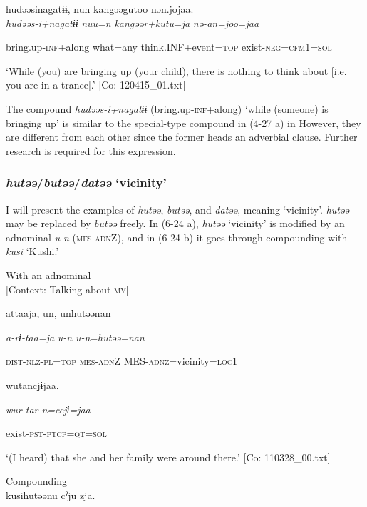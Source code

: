 \ea\label{ex:6-23}
{\TM}
\gll hudəəsinagatɨɨ,  nun  kangəəgutoo  nən.jojaa.\\

    \textit{hudəəs-i+nagatɨɨ}  \textit{nuu=n}  \textit{kangəər+kutu=ja}  \textit{nə-an=joo=jaa}

    bring.up-\textsc{inf}+along  what=any  think.INF+event=\textsc{top}  exist-\textsc{neg}=\textsc{cfm}1=\textsc{sol}

\glt    ‘While (you) are bringing up (your child), there is nothing to think about [i.e. you are in a trance].’ [Co: 120415\_01.txt]
\z

The compound \textit{hudəəs-i+nagatɨɨ} (bring.up-\textsc{inf}+along) ‘while (someone) is bringing up’ is similar to the special-type compound in (4-27 a) in  However, they are different from each other since the former heads an adverbial clause. Further research is required for this expression.

\subsubsection{\textit{hutəə}/\textit{butəə}/\textit{datəə} ‘vicinity’}

I will present the examples of \textit{hutəə}, \textit{butəə}, and \textit{datəə}, meaning ‘vicinity’. \textit{hutəə} may be replaced by \textit{butəə} freely. In (6-24 a), \textit{hutəə} ‘vicinity’ is modified by an adnominal \textit{u-n} (\textsc{mes}-\textsc{adn}Z), and in (6-24 b) it goes through compounding with \textit{kusi} ‘Kushi.’

\ea\label{ex:6-24}
\ea With an adnominal\\{}
[Context: Talking about \textsc{my}]

{\TM}
\gll attaaja,  un,  unhutəənan

      \textit{a-rɨ-taa=ja}  \textit{u-n}  \textit{u-n=hutəə=nan}

      \textsc{dist}-\textsc{nlz}-\textsc{pl}=\textsc{top}  \textsc{mes}-\textsc{adn}Z  MES-\textsc{adnz}=vicinity=\textsc{loc}1

      wutancjɨjaa.

      \textit{wur-tar-n=ccjɨ=jaa}

      exist-\textsc{pst}-\textsc{ptcp}=\textsc{qt}=\textsc{sol}

\glt ‘(I heard) that she and her family were around there.’ [Co: 110328\_00.txt]
\z

 \ex Compounding\\
{\TM}
\gll  kusihutəənu  cˀju  zja.\\

